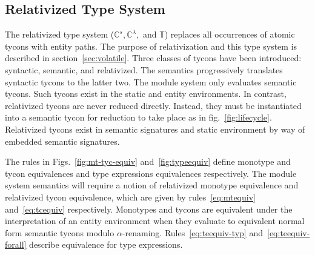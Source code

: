 \documentclass[9pt,nocopyrightspace, fleqn]{sigplanconf}
\begin{document}
\subsection{Relativized Type System}\label{sec:relativized-type-sys}
The relativized type system ($\mathbb{C}^s, \mathbb{C}^\lambda,$ and
$\mathbb{T}$) replaces all occurrences of atomic tycons with entity
paths.
The purpose of relativization and this type system is described
in section~\ref{sec:volatile}. Three classes of tycons have been
introduced: syntactic, semantic, and relativized. The semantics
progressively translates syntactic tycons to the latter two. The
module system only evaluates semantic tycons. Such tycons exist in the
static and entity environments. In contrast, relativized tycons are
never reduced directly. Instead, they must be instantiated into a
semantic tycon for reduction to take place as in
fig.~\ref{fig:lifecycle}. Relativized tycons exist in semantic
signatures and static environment by way of embedded semantic
signatures.


The rules in Figs.~\ref{fig:mt-tyc-equiv} and~\ref{fig:typeequiv}
define monotype and tycon equivalences and type expressions
equivalences respectively.  The module system semantics will require a
notion of relativized monotype equivalence and relativized tycon
equivalence, which are given by rules~\ref{eq:mtequiv}
and~\ref{eq:tcequiv} respectively.  Monotypes and tycons are
equivalent under the interpretation of an entity environment when they
evaluate to equivalent normal form semantic tycons modulo
$\alpha$-renaming. Rules~\ref{eq:teequiv-typ}
and~\ref{eq:teequiv-forall} describe equivalence for type expressions.
\end{document}
